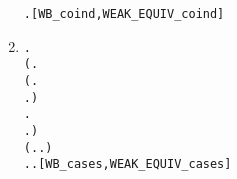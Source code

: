 \begin{enumerate}
\begin{small}
\begin{alltt}
       \HOLSymConst{\HOLTokenForall{}} .    \HOLSymConst{\HOLTokenImp{}}   \hfill{[WB_coind, WEAK_EQUIV_coind]}
\end{alltt}
\end{small}
\item %
\begin{small}
\begin{alltt}
\HOLTokenTurnstile{} \HOLSymConst{\HOLTokenForall{}} .
          \HOLSymConst{\HOLTokenEquiv{}}
       (\HOLSymConst{\HOLTokenForall{}}.
            (\HOLSymConst{\HOLTokenForall{}}.
                  \HOLTokenTransBegin{} \HOLTokenTransEnd {} \HOLSymConst{\HOLTokenImp{}}
                 \HOLSymConst{\HOLTokenExists{}}.  \HOLTokenWeakTransBegin{} \HOLTokenWeakTransEnd {} \HOLSymConst{\HOLTokenConj{}}   ) \HOLSymConst{\HOLTokenConj{}}
            \HOLSymConst{\HOLTokenForall{}}.
                 \HOLTokenTransBegin{} \HOLTokenTransEnd {} \HOLSymConst{\HOLTokenImp{}}
                \HOLSymConst{\HOLTokenExists{}}.  \HOLTokenWeakTransBegin{} \HOLTokenWeakTransEnd {} \HOLSymConst{\HOLTokenConj{}}   ) \HOLSymConst{\HOLTokenConj{}}
       (\HOLSymConst{\HOLTokenForall{}}.  \HOLTokenTransBegin\HOLSymConst{\ensuremath{\tau}}\HOLTokenTransEnd {} \HOLSymConst{\HOLTokenImp{}} \HOLSymConst{\HOLTokenExists{}}.  \HOLSymConst{\HOLTokenEPS}  \HOLSymConst{\HOLTokenConj{}}   ) \HOLSymConst{\HOLTokenConj{}}
       \HOLSymConst{\HOLTokenForall{}}.  \HOLTokenTransBegin\HOLSymConst{\ensuremath{\tau}}\HOLTokenTransEnd {} \HOLSymConst{\HOLTokenImp{}} \HOLSymConst{\HOLTokenExists{}}.  \HOLSymConst{\HOLTokenEPS}  \HOLSymConst{\HOLTokenConj{}}   \hfill{[WB_cases, WEAK_EQUIV_cases]}
\end{alltt}
\end{small}
\end{enumerate}

